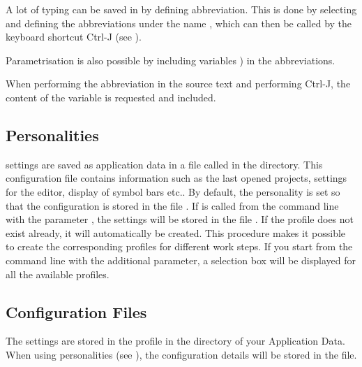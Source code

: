 A lot of typing can be saved in \codeblocks by defining abbreviation. This is done by selecting  and defining the abbreviations under the name , which can then be called by the keyboard shortcut Ctrl-J (see ).


Parametrisation is also possible by including variables ) in the abbreviations.


When performing the abbreviation  in the source text and performing Ctrl-J, the content of the variable is requested and included.

\subsection{Personalities}

\codeblocks settings are saved as application data in a file called  in the  directory. This configuration file contains information such as the last opened projects, settings for the editor, display of symbol bars etc.. By default, the  personality is set so that the configuration is stored in the file . If \codeblocks is called from the command line with the parameter , the settings will be stored in the file . If the profile does not exist already, it will automatically be created. This procedure makes it possible to create the corresponding profiles for different work steps. If you start \codeblocks from the command line with the additional parameter, a selection box will be displayed for all the available profiles.


\subsection{Configuration Files}

The \codeblocks settings are stored in the  profile in the  directory of your Application Data. When using personalities (see ), the configuration details will be stored in the  file.

